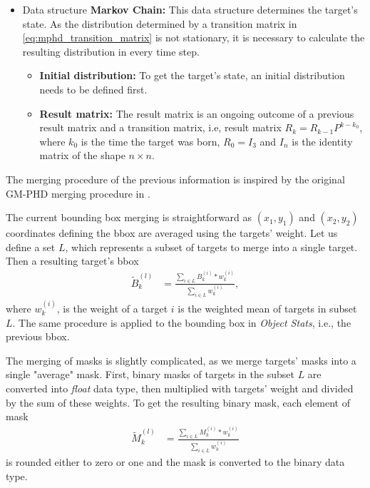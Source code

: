 \begin{itemize}
\begin{itemize}
      \end{itemize}
  \item Data structure \textbf{Markov Chain:} This data structure determines the target's state. As the
  distribution determined by a transition matrix in \eqref{eq:mphd_transition_matrix} is not stationary, it is necessary
  to calculate the resulting distribution in every time step.
      \begin{itemize}
        \item \textbf{Initial distribution:} To get the target's state, an initial distribution needs to be defined
        first.
        \item \textbf{Result matrix:} The result matrix is an ongoing outcome of a previous result matrix and a
        transition
        matrix, i.e, result matrix $R_k = R_{k-1} P^{k-k_0}$, where $k_0$ is the time the target was born,
        $R_0 = I_3$ and $I_n$ is the identity matrix of the shape $n\times n$.
      \end{itemize}
\end{itemize}

The merging procedure of the previous information is inspired by the original GM-PHD merging procedure in
\cite{VoMaPHD2006}.

The current bounding box merging is straightforward as $(x_1,y_1)$ and $(x_2,y_2)$ coordinates defining the bbox are
averaged using the targets' weight. Let us define a set $L$, which represents a subset of targets to merge into a single
target. Then a resulting target's bbox
\begin{align}
  \tilde{B}_k^{(l)} &= \frac{\sum_{i \in L} B_k^{(i)} * w_k^{(i)}}{\sum_{i \in L}{w_k^{(i)}}},
\end{align}
where $w_k^{(i)}$, is the weight of a target $i$ is the weighted mean of targets in subset $L$. The same procedure is
applied to the bounding box in \textit{Object Stats}, i.e., the previous bbox.

The merging of masks is slightly complicated, as we merge targets' masks into a single "average" mask. First, binary
masks of targets in the subset $L$ are converted into \textit{float} data type, then multiplied with targets' weight
and
divided by the sum of these weights. To get the resulting binary mask, each element of mask
\begin{align}
  \tilde{M}_k^{(l)} &= \frac{\sum_{i \in L} M_k^{(i)} * w_k^{(i)}}{\sum_{i \in L}{w_k^{(i)}}}
\end{align}
is rounded either to zero or one and the mask is converted to the binary data type.

